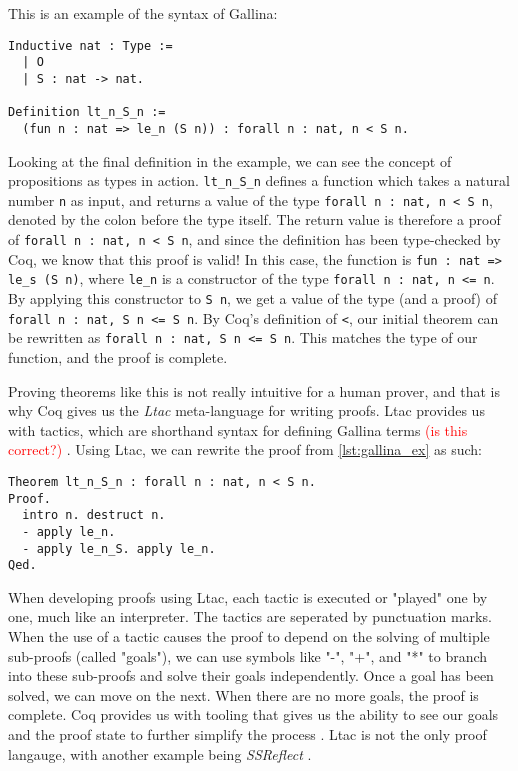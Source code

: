 This is an example of the syntax of Gallina:

\begin{minipage}{\linewidth}
\begin{lstlisting}[language=Coq, label={lst:gallina_ex}, caption={Example of Gallina syntax}]
Inductive nat : Type :=
  | O
  | S : nat -> nat.

Definition lt_n_S_n :=
  (fun n : nat => le_n (S n)) : forall n : nat, n < S n.
\end{lstlisting}
\end{minipage}

Looking at the final definition in the example, we can see the
concept of propositions as types in action.
\lstinline{lt_n_S_n} defines a function which takes a natural number \lstinline{n}
as input, and returns a value of the type \lstinline{forall n : nat, n < S n},
denoted by the colon before the type itself.
The return value is therefore a proof of \lstinline{forall n : nat, n < S n}, and since
the definition has been type-checked by Coq, we know that this proof is valid!
In this case, the function is
\lstinline{fun : nat => le_s (S n)}, where \lstinline{le_n} is a constructor
of the type \lstinline{forall n : nat, n <= n}. By applying this constructor
to \lstinline{S n}, we get a value of the type (and a proof) of
\lstinline{forall n : nat, S n <= S n}. By Coq's definition of \lstinline{<},
our initial theorem can be rewritten as \lstinline{forall n : nat, S n <= S n}.
This matches the type of our function, and the proof is complete.

Proving theorems like this is not really intuitive for a human prover,
and that is why Coq gives us the \textit{Ltac} meta-language for writing proofs.
Ltac provides us with tactics, which are shorthand syntax for defining Gallina terms \textcolor{red}{(is this correct?)} \cite{cltac}.
Using Ltac, we can rewrite the proof from \ref{lst:gallina_ex} as such:

\begin{minipage}{\linewidth}
\begin{lstlisting}[language=Coq, label={lst:ltac_ex}, caption={Example of Ltac syntax}]
Theorem lt_n_S_n : forall n : nat, n < S n.
Proof.
  intro n. destruct n.
  - apply le_n.
  - apply le_n_S. apply le_n.
Qed.
\end{lstlisting}
\end{minipage}

When developing proofs using Ltac, each tactic is executed or "played" one by one,
much like an interpreter. The tactics are seperated by punctuation marks.
When the use of a tactic causes the proof to depend on the solving of multiple sub-proofs (called "goals"),
we can use symbols like "-", "+", and "*" to branch into these sub-proofs and solve their goals independently.
Once a goal has been solved, we can move on the next. When there are no more goals, the proof is complete.
Coq provides us with tooling that gives us the ability to see our goals and the proof state
to further simplify the process \cite{cide}.
Ltac is not the only proof langauge, with another example being \textit{SSReflect} \cite{cssr}.

